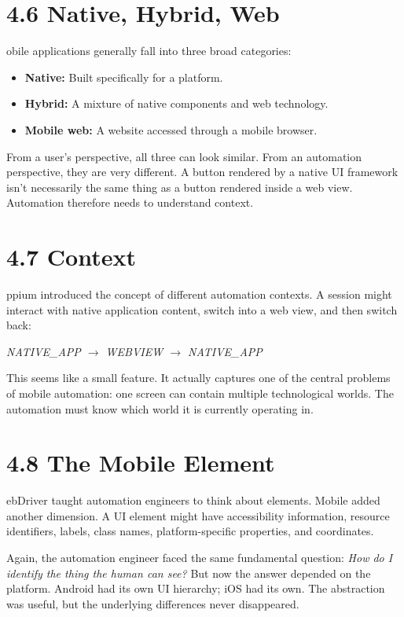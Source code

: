 \documentclass[11pt, a4paper, openany]{book}
\newcommand{\initialcap}[1]{{\fontfamily{lmss}\selectfont\huge\textbf{#1}}}
\begin{document}
\section{4.6 Native, Hybrid, Web}
\noindent \initialcap{M}obile applications generally fall into three broad categories:
\begin{itemize}
    \item \textbf{Native:} Built specifically for a platform.
    \item \textbf{Hybrid:} A mixture of native components and web technology.
    \item \textbf{Mobile web:} A website accessed through a mobile browser.
\end{itemize}
From a user's perspective, all three can look similar. From an automation perspective, they are very different. A button rendered by a native UI framework isn't necessarily the same thing as a button rendered inside a web view. Automation therefore needs to understand context.

\section{4.7 Context}
\noindent \initialcap{A}ppium introduced the concept of different automation contexts. A session might interact with native application content, switch into a web view, and then switch back:
\begin{center}
\textit{NATIVE\_APP $\rightarrow$ WEBVIEW $\rightarrow$ NATIVE\_APP}
\end{center}
This seems like a small feature. It actually captures one of the central problems of mobile automation: one screen can contain multiple technological worlds. The automation must know which world it is currently operating in.

\section{4.8 The Mobile Element}
\noindent \initialcap{W}ebDriver taught automation engineers to think about elements. Mobile added another dimension. A UI element might have accessibility information, resource identifiers, labels, class names, platform-specific properties, and coordinates. 

Again, the automation engineer faced the same fundamental question: \textit{How do I identify the thing the human can see?} But now the answer depended on the platform. Android had its own UI hierarchy; iOS had its own. The abstraction was useful, but the underlying differences never disappeared.
\end{document}
